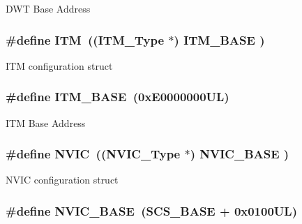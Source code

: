 D\-W\-T Base Address \hypertarget{group__CMSIS__core__base_gabae7cdf882def602cb787bb039ff6a43}{
\subsubsection[{I\-T\-M}]{\setlength{\rightskip}{0pt plus 5cm}\#define I\-T\-M~(({\bf I\-T\-M\-\_\-\-Type}       $\ast$)     {\bf I\-T\-M\-\_\-\-B\-A\-S\-E}      )}}\label{group__CMSIS__core__base_gabae7cdf882def602cb787bb039ff6a43}
I\-T\-M configuration struct \hypertarget{group__CMSIS__core__base_gadd76251e412a195ec0a8f47227a8359e}{
\subsubsection[{I\-T\-M\-\_\-\-B\-A\-S\-E}]{\setlength{\rightskip}{0pt plus 5cm}\#define I\-T\-M\-\_\-\-B\-A\-S\-E~(0x\-E0000000\-U\-L)}}\label{group__CMSIS__core__base_gadd76251e412a195ec0a8f47227a8359e}
I\-T\-M Base Address \hypertarget{group__CMSIS__core__base_gac8e97e8ce56ae9f57da1363a937f8a17}{
\subsubsection[{N\-V\-I\-C}]{\setlength{\rightskip}{0pt plus 5cm}\#define N\-V\-I\-C~(({\bf N\-V\-I\-C\-\_\-\-Type}      $\ast$)     {\bf N\-V\-I\-C\-\_\-\-B\-A\-S\-E}     )}}\label{group__CMSIS__core__base_gac8e97e8ce56ae9f57da1363a937f8a17}
N\-V\-I\-C configuration struct \hypertarget{group__CMSIS__core__base_gaa0288691785a5f868238e0468b39523d}{
\subsubsection[{N\-V\-I\-C\-\_\-\-B\-A\-S\-E}]{\setlength{\rightskip}{0pt plus 5cm}\#define N\-V\-I\-C\-\_\-\-B\-A\-S\-E~({\bf S\-C\-S\-\_\-\-B\-A\-S\-E} +  0x0100\-U\-L)}}\label{group__CMSIS__core__base_gaa0288691785a5f868238e0468b39523d}
